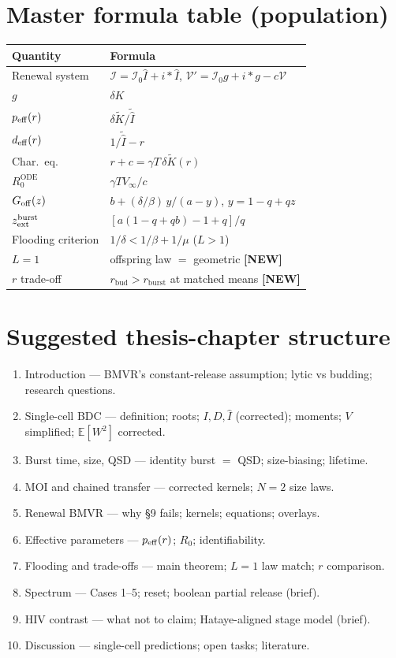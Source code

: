 \documentclass[11pt,a4paper]{article}
\newcommand{\E}{\mathbb{E}}
\newcommand{\Ihat}{\widehat{I}}
\newcommand{\Icell}{\mathcal{I}}
\newcommand{\Vfree}{\mathcal{V}}
\newcommand{\Lap}[1]{\widetilde{#1}}
\theoremstyle{plain}
\theoremstyle{definition}
\theoremstyle{remark}
\newcommand{\NEW}{\textcolor{blue!55!black}{\textbf{[NEW]}}}
\begin{document}
\section{Master formula table (population)}
\label{sec:table-pop}

\begin{center}
\renewcommand{\arraystretch}{1.35}
\begin{tabular}{@{}p{}p{}@{}}
\toprule
Quantity & Formula \\
\midrule
Renewal system & $\Icell=\Icell_0\Ihat+i*\Ihat$, $\Vfree'=\Icell_0 g+i*g-c\Vfree$ \\
$g$ & $\delta K$ \\
$p_{\rm eff}(r)$ & $\delta\Lap{K}/\Lap{\Ihat}$ \\
$d_{\rm eff}(r)$ & $1/\Lap{\Ihat}-r$ \\
Char.\ eq. & $r+c=\gamma T\,\delta\Lap{K}(r)$ \\
$R_0^{\mathrm{ODE}}$ & $\gamma T V_\infty/c$ \\
$G_{\rm off}(z)$ & $b+(\delta/\beta)\,y/(a-y)$, $y=1-q+qz$ \\
$z_{\rm ext}^{\rm burst}$ & $[a(1-q+qb)-1+q]/q$ \\
Flooding criterion & $1/\delta<1/\beta+1/\mu$ ($L>1$) \\
$L=1$ & offspring law $=$ geometric \NEW \\
$r$ trade-off & $r_{\mathrm{bud}}>r_{\mathrm{burst}}$ at matched means \NEW \\
\bottomrule
\end{tabular}
\end{center}

\section{Suggested thesis-chapter structure}
\label{sec:thesis-plan}

\begin{enumerate}
\item Introduction --- BMVR's constant-release assumption; lytic vs budding;
  research questions.
\item Single-cell BDC --- definition; roots; $I,D,\Ihat$ (corrected); moments;
  $V$ simplified; $\E[W^2]$ corrected.
\item Burst time, size, QSD --- identity burst $=$ QSD; size-biasing; lifetime.
\item MOI and chained transfer --- corrected kernels; $N=2$ size laws.
\item Renewal BMVR --- why \S9 fails; kernels; equations; overlays.
\item Effective parameters --- $p_{\rm eff}(r)$; $R_0$; identifiability.
\item Flooding and trade-offs --- main theorem; $L=1$ law match; $r$ comparison.
\item Spectrum --- Cases 1--5; reset; boolean partial release (brief).
\item HIV contrast --- what not to claim; Hataye-aligned stage model (brief).
\item Discussion --- single-cell predictions; open tasks; literature.
\end{enumerate}
\end{document}
